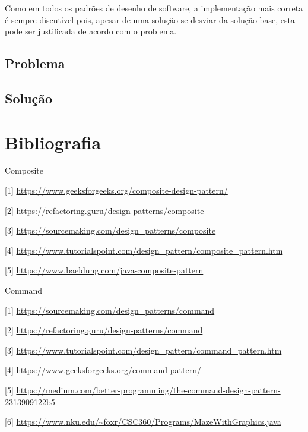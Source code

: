 \documentclass[10pt,portuguese]{article}
\begin{document}
\par Como em todos os padrões de desenho de software, a implementação mais correta é sempre discutível pois, apesar de uma solução se desviar da solução-base, esta pode ser justificada de acordo com o problema.

\subsection{Problema}
\subsection{Solução}


\clearpage

\section{Bibliografia}





\vspace{5mm} %

\par Composite

[1] \url{https://www.geeksforgeeks.org/composite-design-pattern/}

[2] \url{https://refactoring.guru/design-patterns/composite}

[3] \url{https://sourcemaking.com/design_patterns/composite}

[4] \url{https://www.tutorialspoint.com/design_pattern/composite_pattern.htm}

[5] \url{https://www.baeldung.com/java-composite-pattern}

\par Command

[1] \url{https://sourcemaking.com/design_patterns/command}

[2] \url{https://refactoring.guru/design-patterns/command}

[3] \url{https://www.tutorialspoint.com/design_pattern/command_pattern.htm}

[4] \url{https://www.geeksforgeeks.org/command-pattern/}

[5] \url{https://medium.com/better-programming/the-command-design-pattern-2313909122b5}

[6] \url{https://www.nku.edu/~foxr/CSC360/Programs/MazeWithGraphics.java}
\end{document}
